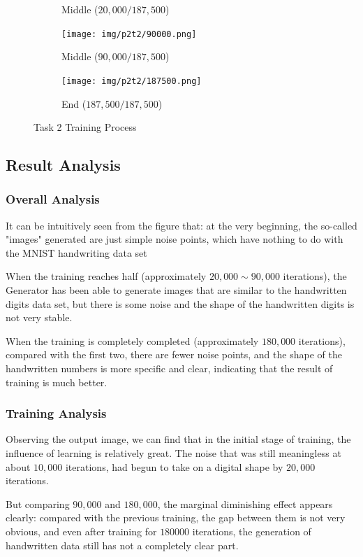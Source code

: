 \begin{figure}[!htbp]
\begin{subfigure}[b]{0.3\textwidth}
    \caption{Middle ($20,000/187,500$)}
  \end{subfigure}
  \begin{subfigure}[b]{0.3\textwidth}
    \texttt{[image: img/p2t2/90000.png]}
    \caption{Middle ($90,000/187,500$)}
  \end{subfigure}
  \begin{subfigure}[b]{0.3\textwidth}
    \texttt{[image: img/p2t2/187500.png]}
    \caption{End ($187,500/187,500$)}
  \end{subfigure}
  \caption{Task 2 Training Process}
  \label{fig:p2t2_train}
\end{figure}

\subsection{Result Analysis}

\subsubsection{Overall Analysis}

It can be intuitively seen from the figure that: at the very beginning, the so-called "images" generated are just simple noise points, which have nothing to do with the MNIST handwriting data set

When the training reaches half (approximately $20,000 \sim 90,000$ iterations),
the Generator has been able to generate images that are similar to the handwritten digits data set, but there is some noise and the shape of the handwritten digits is not very stable.

When the training is completely completed (approximately $180,000$ iterations),
compared with the first two, there are fewer noise points, and the shape of the handwritten numbers is more specific and clear, indicating that the result of training is much better.

\subsubsection{Training Analysis}

Observing the output image, we can find that in the initial stage of training, the influence of learning is relatively great.
The noise that was still meaningless at about $10,000$ iterations, had begun to take on a digital shape by $20,000$ iterations.

But comparing $90,000$ and $180,000$, the marginal diminishing effect appears clearly:
compared with the previous training, the gap between them is not very obvious, and even after training for $180000$ iterations, the generation of handwritten data still has not a completely clear part.

